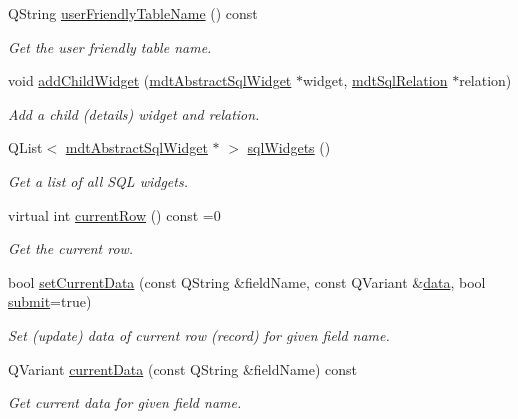 \begin{DoxyCompactItemize}
Q\-String \hyperlink{classmdt_abstract_sql_widget_a8207edaf31a7d988db5b86a4099ad4eb}{user\-Friendly\-Table\-Name} () const 
\begin{DoxyCompactList}\small\item\em Get the user friendly table name. \end{DoxyCompactList}\item 
void \hyperlink{classmdt_abstract_sql_widget_a7225af05f3b10e82db939f0ec0996167}{add\-Child\-Widget} (\hyperlink{classmdt_abstract_sql_widget}{mdt\-Abstract\-Sql\-Widget} $\ast$widget, \hyperlink{classmdt_sql_relation}{mdt\-Sql\-Relation} $\ast$relation)
\begin{DoxyCompactList}\small\item\em Add a child (details) widget and relation. \end{DoxyCompactList}\item 
Q\-List$<$ \hyperlink{classmdt_abstract_sql_widget}{mdt\-Abstract\-Sql\-Widget} $\ast$ $>$ \hyperlink{classmdt_abstract_sql_widget_aa1b5762e5573c3e50c528bc0232a2b37}{sql\-Widgets} ()
\begin{DoxyCompactList}\small\item\em Get a list of all S\-Q\-L widgets. \end{DoxyCompactList}\item 
virtual int \hyperlink{classmdt_abstract_sql_widget_ab48f6375f55f1eaba309fb17aaaf5770}{current\-Row} () const =0
\begin{DoxyCompactList}\small\item\em Get the current row. \end{DoxyCompactList}\item 
bool \hyperlink{classmdt_abstract_sql_widget_add434461de436509b853fa9184c41360}{set\-Current\-Data} (const Q\-String \&field\-Name, const Q\-Variant \&\hyperlink{classmdt_abstract_sql_widget_a3d362ebfc2d4f4b40b48ca08db287b3c}{data}, bool \hyperlink{classmdt_abstract_sql_widget_a6678c45b0d46eb163f5b09d79ed001b5}{submit}=true)
\begin{DoxyCompactList}\small\item\em Set (update) data of current row (record) for given field name. \end{DoxyCompactList}\item 
Q\-Variant \hyperlink{classmdt_abstract_sql_widget_a10a2d7fff69ec7043db0df05cbbaa63c}{current\-Data} (const Q\-String \&field\-Name) const 
\begin{DoxyCompactList}\small\item\em Get current data for given field name. \end{DoxyCompactList}\item 

\end{DoxyCompactItemize}
